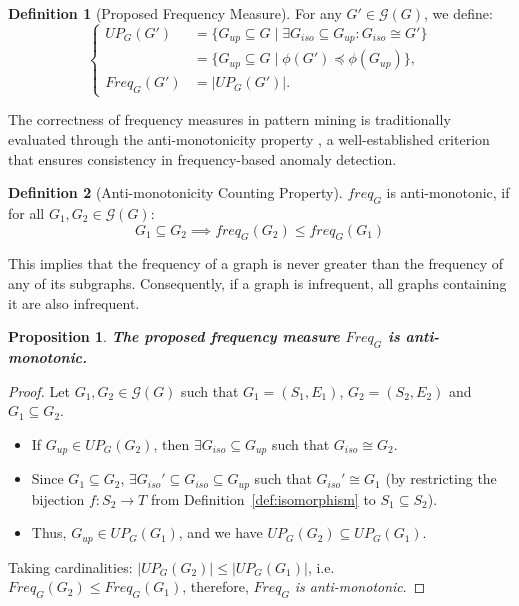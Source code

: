 \documentclass[preprint,12pt]{elsarticle}
\theoremstyle{plain}
\newtheorem{proposition}[theorem]{Proposition}
\theoremstyle{definition}
\newtheorem{definition}{Definition}
\theoremstyle{remark}
\begin{document}
\begin{definition}[Proposed Frequency Measure]
For any $G' \in \mathcal{G}(G)$, we define:
\[
\begin{cases}
    UP_G(G') &= \{G_{up} \subseteq G \mid \exists G_{iso} \subseteq G_{up}: G_{iso} \cong G'\} \\
    &= \{G_{up} \subseteq G \mid \phi(G') \preceq \phi(G_{up})\}, \\
    Freq_G(G') &= |UP_G(G')|.
\end{cases}
\]
\end{definition}

The correctness of frequency measures in pattern mining is traditionally evaluated through the anti-monotonicity property \cite{calders2008anti}, a well-established criterion that ensures consistency in frequency-based anomaly detection.

\begin{definition}[Anti-monotonicity Counting Property]
$freq_G$ is anti-monotonic, if for all $G_1, G_2 \in \mathcal{G}(G)$: \[G_1 \subseteq G_2 \implies freq_G(G_2) \le freq_G(G_1)\]

This implies that the frequency of a graph is never greater than the frequency of any of its subgraphs. Consequently, if a graph is infrequent, all graphs containing it are also infrequent.
\end{definition}

\vspace{13pt}
\begin{proposition}
\textbf{The proposed frequency measure $Freq_G$ is anti-monotonic.}
\label{prop:antimonotonicity}
\end{proposition}

\begin{proof}
Let $G_1, G_2 \in \mathcal{G}(G)$ such that $G_1=(S_1, E_1)$, $G_2=(S_2, E_2)$ and $G_1 \subseteq G_2$.
\begin{itemize}
    \item If $G_{up} \in UP_G(G_2)$, then $\exists G_{iso} \subseteq G_{up}$ such that $G_{iso} \cong G_2$.
    \item Since $G_1 \subseteq G_2$, $\exists G_{iso}' \subseteq G_{iso} \subseteq G_{up}$ such that $G_{iso}' \cong G_1$ (by restricting the bijection $f: S_2 \to T$ from Definition~\ref{def:isomorphism} to $S_1 \subseteq S_2$).
    \item Thus, $G_{up} \in UP_G(G_1)$, and we have $UP_G(G_2) \subseteq UP_G(G_1)$.
\end{itemize}
Taking cardinalities: $|UP_G(G_2)| \leq |UP_G(G_1)|$, i.e. $Freq_G(G_2) \leq Freq_G(G_1)$, therefore, $Freq_G$ \textit{is anti-monotonic}.
\end{proof}
\vspace{5pt}
\end{document}
